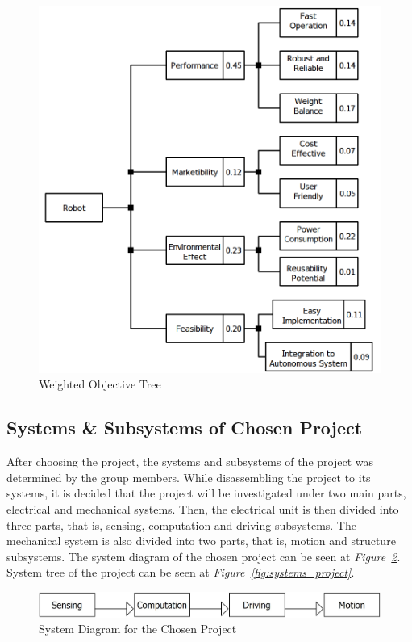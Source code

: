 \documentclass[a4paper,12pt]{article}
\begin{document}
	\begin{figure}[H]
		\centering
		\includegraphics[width=.7\textwidth,center]{objective-tree/objective-tree} 
		\caption{\label{fig:product_tree}Weighted Objective Tree}
	\end{figure}
	
	
	
	\subsection{Systems \& Subsystems of Chosen Project}	
	After choosing the project, the systems and subsystems of the project was determined by the group members. While disassembling the project to its systems, it is decided that the project will be investigated under two main parts, electrical and mechanical systems. Then, the electrical unit is then divided into three parts, that is, sensing, computation and driving subsystems. The mechanical system is also divided into two parts, that is, motion and structure subsystems. The system diagram of the chosen project can be seen at \textit{Figure~\ref{fig:system_diagram}}. System tree of the project can be seen at \textit{Figure~\ref{fig:systems_project}}.
	
	\begin{figure}[H]
		\centering
		\includegraphics[width=\textwidth,height=\textheight,keepaspectratio]{product-tree/system-flow} 
		\caption{\label{fig:system_diagram}System Diagram for the Chosen Project}
	\end{figure}
	
\end{document}
